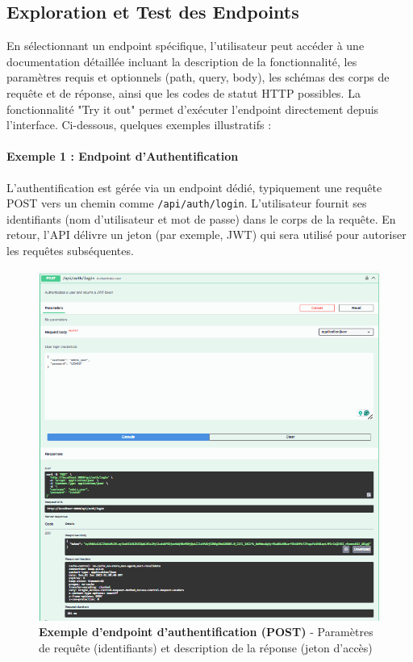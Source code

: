 \documentclass[10pt]{article}
\begin{document}
\subsection{Exploration et Test des Endpoints}
En sélectionnant un endpoint spécifique, l'utilisateur peut accéder à une documentation détaillée incluant la description de la fonctionnalité, les paramètres requis et optionnels (path, query, body), les schémas des corps de requête et de réponse, ainsi que les codes de statut HTTP possibles. La fonctionnalité "Try it out" permet d'exécuter l'endpoint directement depuis l'interface. Ci-dessous, quelques exemples illustratifs :

\paragraph{Exemple 1 : Endpoint d'Authentification}
L'authentification est gérée via un endpoint dédié, typiquement une requête POST vers un chemin comme \texttt{/api/auth/login}. L'utilisateur fournit ses identifiants (nom d'utilisateur et mot de passe) dans le corps de la requête. En retour, l'API délivre un jeton (par exemple, JWT) qui sera utilisé pour autoriser les requêtes subséquentes.

\begin{figure}[H]
    \centering
    \begin{tcolorbox}[
        width=0.9\textwidth,
        colback=white,
        colframe=secondarygreen,
        boxrule=1pt,
        arc=5pt,
        boxsep=5pt
    ]
        \includegraphics[width=\textwidth]{screenshots/swagger_auth_endpoint.png}
    \end{tcolorbox}
    \caption{\textbf{Exemple d'endpoint d'authentification (POST)} - Paramètres de requête (identifiants) et description de la réponse (jeton d'accès)}
    \label{fig:swagger_auth_endpoint}
\end{figure}
\end{document}

